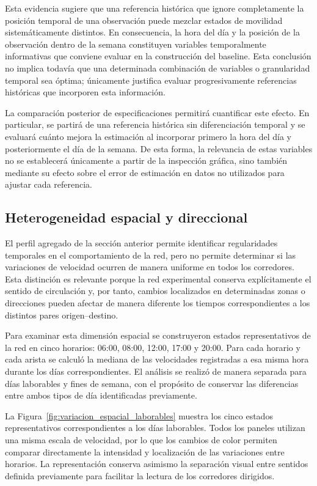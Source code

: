 \documentclass[11pt]{article}
\begin{document}
Esta evidencia sugiere que una referencia histórica que ignore completamente la posición temporal de una observación puede mezclar estados de movilidad sistemáticamente distintos. En consecuencia, la hora del día y la posición de la observación dentro de la semana constituyen variables temporalmente informativas que conviene evaluar en la construcción del baseline. Esta conclusión no implica todavía que una determinada combinación de variables o granularidad temporal sea óptima; únicamente justifica evaluar progresivamente referencias históricas que incorporen esta información.

La comparación posterior de especificaciones permitirá cuantificar este efecto. En particular, se partirá de una referencia histórica sin diferenciación temporal y se evaluará cuánto mejora la estimación al incorporar primero la hora del día y posteriormente el día de la semana. De esta forma, la relevancia de estas variables no se establecerá únicamente a partir de la inspección gráfica, sino también mediante su efecto sobre el error de estimación en datos no utilizados para ajustar cada referencia.

\subsection{Heterogeneidad espacial y direccional}

El perfil agregado de la sección anterior permite identificar regularidades temporales en el comportamiento de la red, pero no permite determinar si las variaciones de velocidad ocurren de manera uniforme en todos los corredores. Esta distinción es relevante porque la red experimental conserva explícitamente el sentido de circulación y, por tanto, cambios localizados en determinadas zonas o direcciones pueden afectar de manera diferente los tiempos correspondientes a los distintos pares origen--destino.

Para examinar esta dimensión espacial se construyeron estados representativos de la red en cinco horarios: 06:00, 08:00, 12:00, 17:00 y 20:00. Para cada horario y cada arista se calculó la mediana de las velocidades registradas a esa misma hora durante los días correspondientes. El análisis se realizó de manera separada para días laborables y fines de semana, con el propósito de conservar las diferencias entre ambos tipos de día identificadas previamente.

La Figura~\ref{fig:variacion_espacial_laborables} muestra los cinco estados representativos correspondientes a los días laborables. Todos los paneles utilizan una misma escala de velocidad, por lo que los cambios de color permiten comparar directamente la intensidad y localización de las variaciones entre horarios. La representación conserva asimismo la separación visual entre sentidos definida previamente para facilitar la lectura de los corredores dirigidos.
\end{document}
